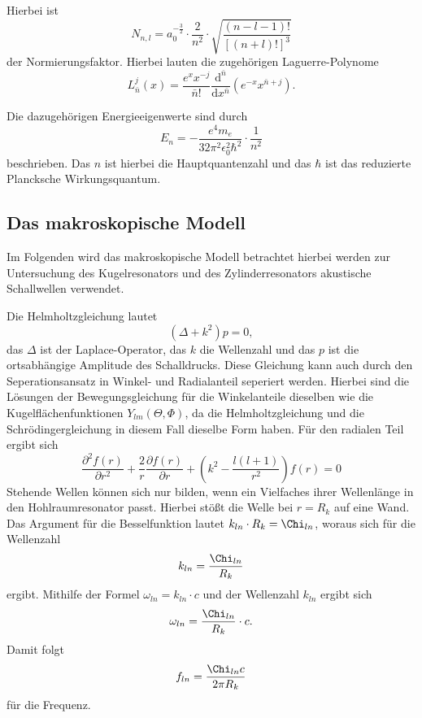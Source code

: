 Hierbei ist 
\begin{equation*}
N_{n,l} = a_0^{-\frac{3}{2}} \cdot \frac{2}{n^2} \cdot \sqrt{\frac{(n-l-1)!}{[(n+l)!]^3}}
\end{equation*}
der Normierungsfaktor.
Hierbei lauten die zugehörigen Laguerre-Polynome
\begin{equation*}
L_{\bar{n}}^j (x) = \frac{e^x x^{-j}}{\bar{n}!} \frac{\mathrm{d}^{\bar{n}}}{\mathrm{d}x^{\bar{n}}} (e^{-x} x^{\bar{n}+j}).
\end{equation*}

Die dazugehörigen Energieeigenwerte sind durch 
\begin{equation*}
    E_n = -\frac{e^4 m_e}{32 \pi^2 \epsilon_0^2 \hbar^2} \cdot \frac{1}{n^2}
\end{equation*}
beschrieben.
Das $n$ ist hierbei die Hauptquantenzahl und das $\hbar$ ist das reduzierte Plancksche Wirkungsquantum.

\subsection{Das makroskopische Modell}
Im Folgenden wird das makroskopische Modell betrachtet hierbei werden zur Untersuchung des Kugelresonators und des Zylinderresonators akustische Schallwellen verwendet. 

Die Helmholtzgleichung lautet 
\begin{equation*}
    (\Delta + k^2)p = 0, 
\end{equation*}
das $\Delta$ ist der Laplace-Operator, das $k$ die Wellenzahl und das $p$ ist die ortsabhängige Amplitude des Schalldrucks. 
Diese Gleichung kann auch durch den Seperationsansatz in Winkel- und Radialanteil seperiert werden.
Hierbei sind die Lösungen der Bewegungsgleichung für die Winkelanteile dieselben wie die Kugelflächenfunktionen $Y_{lm}(\Theta, \Phi)$, da die Helmholtzgleichung und die Schrödingergleichung in diesem Fall dieselbe Form haben. 
Für den radialen Teil ergibt sich
\begin{equation*}
    \frac{\partial^2 f(r)}{\partial r^2} + \frac{2}{r} \frac{\partial f(r)}{\partial r} + \left( k^2 - \frac{l(l+1)}{r^2} \right) f(r) = 0
\end{equation*}
Stehende Wellen können sich nur bilden, wenn ein Vielfaches ihrer Wellenlänge in den Hohlraumresonator passt. Hierbei stößt die Welle bei $r = R_k$ auf eine Wand. 
Das Argument für die Besselfunktion lautet $k_{ln} \cdot R_k = \Chi_{ln}$, woraus sich für die Wellenzahl 
\begin{equation*}
    k_{ln} = \frac{\Chi_{ln}}{R_k}
\end{equation*}
ergibt. 
Mithilfe der Formel $\omega_{ln} = k_{ln} \cdot c$ und der Wellenzahl $k_{ln}$ ergibt sich 
\begin{equation*}
    \omega_{ln} = \frac{\Chi_{ln}}{R_k} \cdot c.
\end{equation*}
Damit folgt 
\begin{equation}
    f_{ln} = \frac{\Chi_{ln}c}{2\pi R_k}
    \label{eq:frequnz_kugel}
\end{equation}
für die Frequenz.

